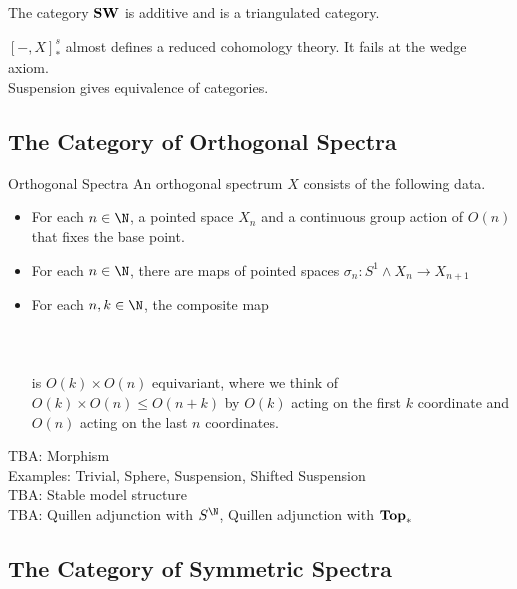 \documentclass[a4paper]{article}
\begin{document}
\begin{prp}{}{} The category $\bold{SW}$ is additive and is a triangulated category. 
\end{prp}

$[-,X]_\ast^s$ almost defines a reduced cohomology theory. It fails at the wedge axiom. \\
Suspension gives equivalence of categories. 

\subsection{The Category of Orthogonal Spectra}
\begin{defn}{Orthogonal Spectra}{} An orthogonal spectrum $X$ consists of the following data. 
\begin{itemize}
\item For each $n\in\N$, a pointed space $X_n$ and a continuous group action of $O(n)$ that fixes the base point. 
\item For each $n\in\N$, there are maps of pointed spaces $\sigma_n:S^1\wedge X_n\to X_{n+1}$
\item For each $n,k\in\N$, the composite map \\~\\
\\~\\
is $O(k)\times O(n)$ equivariant, where we think of $O(k)\times O(n)\leq O(n+k)$ by $O(k)$ acting on the first $k$ coordinate and $O(n)$ acting on the last $n$ coordinates. 
\end{itemize}
\end{defn}

TBA: Morphism\\
Examples: Trivial, Sphere, Suspension, Shifted Suspension\\
TBA: Stable model structure\\
TBA: Quillen adjunction with $S^\N$, Quillen adjunction with $\bold{Top}_\ast$

\subsection{The Category of Symmetric Spectra}
\end{document}

